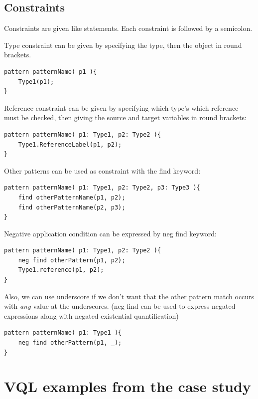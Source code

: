 \subsection{Constraints}
Constraints are given like statements. 
Each constraint is followed by a semicolon.

\vspace{\abovedisplayskip}
\begin{minipage}{\textwidth}
Type constraint can be given by specifying the type, then the object in round brackets.
\begin{lstlisting}[language=vql]
pattern patternName( p1 ){
	Type1(p1);
}
\end{lstlisting}
\end{minipage}
\vspace{\belowdisplayskip}

\begin{minipage}{\textwidth}
Reference constraint can be given by specifying which type's which reference must be checked, then giving the source and target variables in round brackets:
\begin{lstlisting}[language=vql]
pattern patternName( p1: Type1, p2: Type2 ){
	Type1.ReferenceLabel(p1, p2);
}
\end{lstlisting}
\end{minipage}
\vspace{\belowdisplayskip}

\begin{minipage}{\textwidth}
Other patterns can be used as constraint with the find keyword:
\begin{lstlisting}[language=vql]
pattern patternName( p1: Type1, p2: Type2, p3: Type3 ){
	find otherPatternName(p1, p2);
	find otherPatternName(p2, p3);
}
\end{lstlisting}
\end{minipage}
\vspace{\belowdisplayskip}

\begin{minipage}{\textwidth}
Negative application condition can be expressed by neg find keyword:
\begin{lstlisting}[language=vql]
pattern patternName( p1: Type1, p2: Type2 ){
	neg find otherPattern(p1, p2);
	Type1.reference(p1, p2);
}
\end{lstlisting}
\vspace{\belowdisplayskip}

Also, we can use underscore if we don't want that the other pattern match occurs with \emph{any} value at the underscores. (neg find can be used to express negated expressions along with negated existential quantification)

\begin{lstlisting}[language=vql]
pattern patternName( p1: Type1 ){
	neg find otherPattern(p1, _);
}
\end{lstlisting}
\end{minipage}
\vspace{\belowdisplayskip}





\section{VQL examples from the case study}


